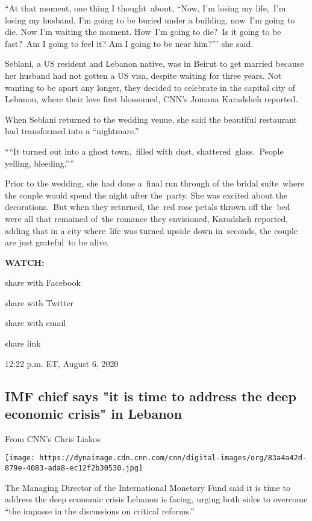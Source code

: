 ``At that moment, one thing I thought~about, ``Now, I'm losing my
life,~I'm losing my husband, I'm going to be buried under a building,
now~I'm going to die. Now I'm waiting the moment. How~I'm going to
die?~Is it going to be fast?~Am I going to feel it? Am I going to be
near him?''' she said.

Seblani, a US resident and Lebanon native, was in Beirut to get married
because her husband had not gotten a US visa, despite waiting for three
years. Not wanting to be apart any longer, they decided to celebrate in
the capital city of Lebanon, where their love first blossomed, CNN's
Jomana Karadsheh reported.

When Seblani returned to the wedding venue, she said the beautiful
restaurant had transformed into a ``nightmare.''

````It turned out into a ghost town,~filled with dust,
shattered~glass.~People yelling, bleeding.''''

Prior to the wedding, she had done a~final run through of the bridal
suite~where the couple would spend the night after the~party. She was
excited about the decorations.~But when they returned, the~red rose
petals thrown off the~bed were all that remained of~the romance they
envisioned, Karadsheh reported, adding that in a city where~life was
turned upside down in~seconds, the couple are just grateful~to be alive.

\textbf{WATCH:}

share with Facebook

share with Twitter

share with email

share link

12:22 p.m. ET, August 6, 2020

\hypertarget{imf-chief-says-it-is-time-to-address-the-deep-economic-crisis-in-lebanon}{%
\subsection{IMF chief says "it is time to address the deep economic
crisis" in
Lebanon}\label{imf-chief-says-it-is-time-to-address-the-deep-economic-crisis-in-lebanon}}

From CNN's Chris Liakos

\texttt{[image: https://dynaimage.cdn.cnn.com/cnn/digital-images/org/83a4a42d-879e-4083-ada8-ec12f2b30530.jpg]}

The Managing Director of the International Monetary Fund said it is time
to address the deep economic crisis Lebanon is facing, urging both sides
to overcome ``the impasse in the discussions on critical reforms.''

